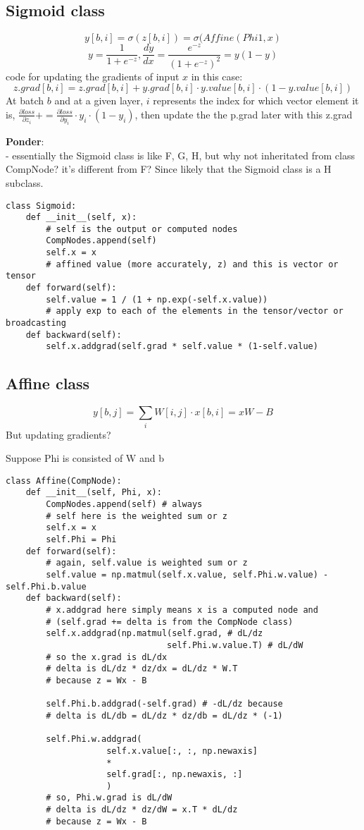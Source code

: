 \documentclass{article}
\begin{document}
\subsection{Sigmoid class}

$$y[b, i] = \sigma(z[b,i]) = \sigma(Affine(Phi1, x)$$
$$y = \frac{1}{1+e^{-z}}, \frac{dy}{dx}=\frac{e^{-z}}{(1+e^{-z})^2}=y(1-y)$$
code for updating the gradients of input $x$ in this case:
$$z.grad[b,i] = z.grad[b,i] + y.grad[b,i]\cdot y.value[b,i]\cdot(1-y.value[b,i])$$
At batch $b$ and at a given layer, $i$ represents the index for which vector element it is, $\frac{\partial loss}{\partial z_{i}} += \frac{\partial loss}{\partial y_{i}} \cdot y_{i} \cdot (1-y_{i})$, then update the the p.grad later with this z.grad

\textbf{Ponder}:\\
- essentially the Sigmoid class is like F, G, H, but why not inheritated from class CompNode? it's different from F? Since likely that the Sigmoid class is a H subclass.
\begin{verbatim}
class Sigmoid: 
    def __init__(self, x):
        # self is the output or computed nodes
        CompNodes.append(self)
        self.x = x 
        # affined value (more accurately, z) and this is vector or tensor
    def forward(self):
        self.value = 1 / (1 + np.exp(-self.x.value))
        # apply exp to each of the elements in the tensor/vector or broadcasting
    def backward(self):
        self.x.addgrad(self.grad * self.value * (1-self.value)
\end{verbatim}
\subsection{Affine class}

$$y[b,j] = \sum_{i} W[i,j]\cdot x[b,i] = xW - B$$
But updating gradients?

Suppose Phi is consisted of W and b

\begin{verbatim}
class Affine(CompNode):
    def __init__(self, Phi, x):
        CompNodes.append(self) # always
        # self here is the weighted sum or z
        self.x = x
        self.Phi = Phi
    def forward(self):
        # again, self.value is weighted sum or z
        self.value = np.matmul(self.x.value, self.Phi.w.value) - self.Phi.b.value
    def backward(self):
        # x.addgrad here simply means x is a computed node and
        # (self.grad += delta is from the CompNode class)
        self.x.addgrad(np.matmul(self.grad, # dL/dz
                                self.Phi.w.value.T) # dL/dW
        # so the x.grad is dL/dx
        # delta is dL/dz * dz/dx = dL/dz * W.T
        # because z = Wx - B
        
        self.Phi.b.addgrad(-self.grad) # -dL/dz because
        # delta is dL/db = dL/dz * dz/db = dL/dz * (-1)
        
        self.Phi.w.addgrad(
                    self.x.value[:, :, np.newaxis] 
                    *
                    self.grad[:, np.newaxis, :]
                    )
        # so, Phi.w.grad is dL/dW
        # delta is dL/dz * dz/dW = x.T * dL/dz 
        # because z = Wx - B
\end{verbatim}
\end{document}
